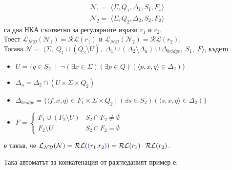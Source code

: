 \documentclass[12pt]{article}
\begin{document}
\begin{align*}
    \mathcal{N}_1 = \; \langle \Sigma, Q_1, \Delta_1, S_1, F_1 \rangle \\
    \mathcal{N}_2 = \; \langle \Sigma, Q_2, \Delta_2, S_2, F_2 \rangle
\end{align*}
са два НКА съответно за регулярните изрази \(r_1\) и \(r_2\). \\
Тоест \(\mathcal{L_{ND}}(\mathcal{N}_1) = \mathcal{RL}(r_1)\) и \(\mathcal{L_{ND}}(\mathcal{N}_2) = \mathcal{RL}(r_2)\). \\
Тогава \(\mathcal{N} = \;\langle \Sigma, \; Q_1 \cup (Q_2 \setminus U), \; \Delta_1 \cup (\Delta_2 \setminus \Delta_u) \cup \Delta_{bridge}, \; S_1, \; F \rangle\), където
\begin{itemize}
    \item \(U = \{q \in S_2 \;\mid\; \lnot(\exists x \in \Sigma)(\exists p \in Q)(\langle p, x, q \rangle \in \Delta_2)\}\)
    \item \(\Delta_u = \Delta_2 \cap (U \times \Sigma \times Q_2)\)
    \item \(\Delta_{bridge} = \{ \langle f, x, q \rangle \in F_1 \times \Sigma \times Q_2 \mid (\exists s \in S_2)( \langle s, x, q \rangle \in \Delta_2)\}\)
    \item \(F = \begin{cases}
	F_1 \cup (F_2 \setminus U) & S_2 \cap F_2 \neq \emptyset \\
    F_2 \setminus U & S_2 \cap F_2 = \emptyset
\end{cases}\)
\end{itemize}
е такъв, че \(\mathcal{L_{ND}}(\mathcal{N}) = \mathcal{RL}(\textcolor{blue}{(} r_1 \textcolor{blue}{.} r_2 \textcolor{blue}{)} ) = \mathcal{RL}(r_1) \cdot \mathcal{RL}(r_2)\). \\\par
Така автоматът за конкатенация от разгледаният пример е:
\begin{center}
\end{center}
\end{document}
